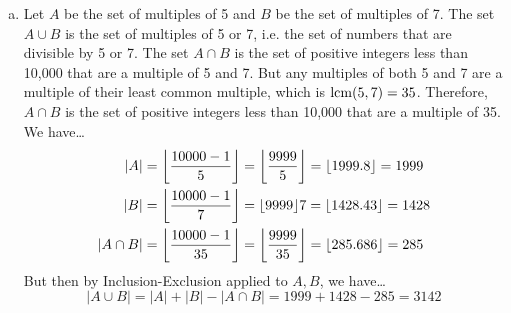 \documentclass[11pt,letterpaper]{article}
\begin{document}
\begin{enumerate}[(a)]
\item Let $A$ be the set of multiples of 5 and $B$ be the set of multiples of 7. The set $A \cup B$ is the set of multiples of 5 or 7, i.e. the set of numbers that are divisible by 5 or 7. The set $A \cap B$ is the set of positive integers less than 10,000 that are a multiple of 5 and 7. But any multiples of both 5 and 7 are a multiple of their least common multiple, which is $\operatorname{lcm}(5, 7)= 35$. Therefore, $A \cap B$ is the set of positive integers less than 10,000 that are a multiple of 35. We have\dots
	\[
	\begin{aligned}
	|A|&= \floor*{\dfrac{10000 - 1}{5}}= \floor*{\dfrac{9999}{5}}= \floor*{1999.8}= 1999 \\
	|B|&= \floor*{\dfrac{10000 - 1}{7}}= \floor*{9999}{7}= \floor*{1428.43}= 1428 \\
	|A \cap B|&= \floor*{\dfrac{10000 - 1}{35}}= \floor*{\dfrac{9999}{35}}= \floor*{285.686}= 285
	\end{aligned}
	\]
But then by Inclusion-Exclusion applied to $A, B$, we have\dots
	\[
	|A \cup B|= |A| + |B| - |A \cap B|= 1999 + 1428 - 285= 3142
	\]


\end{enumerate}
\end{document}
